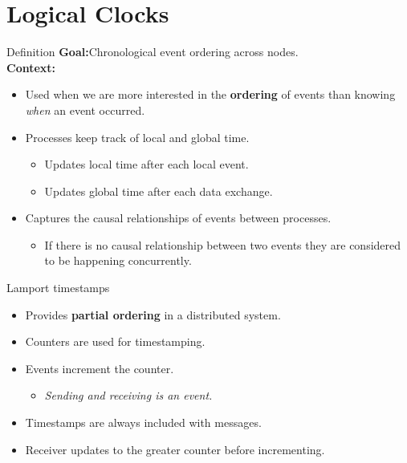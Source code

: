 \documentclass[10pt]{beamer}
\begin{document}
\section{Logical Clocks}

\begin{frame}{Definition}
  \textbf{Goal:}\qquad Chronological event ordering across nodes.\\
  \textbf{Context:}
  \begin{itemize}
    \vspace*{-0.2cm}
    \item Used when we are more interested in the \textbf{ordering} of events than knowing \textit{when} an event occurred.
    \item Processes keep track of local and global time.
    \begin{itemize}
      \item Updates local time after each local event.
      \item Updates global time after each data exchange.
    \end{itemize}
    \item Captures the causal relationships of events between processes.
    \begin{itemize}
      \item If there is no causal relationship between two events they are considered to be happening concurrently.
    \end{itemize}
  \end{itemize}
\end{frame}

\begin{frame}{Lamport timestamps}
  \begin{itemize}
    \item Provides \textbf{partial ordering} in a distributed system.
    \item Counters are used for timestamping.
    \item Events increment the counter.
    \begin{itemize}
      \item \textit{Sending and receiving is an event.}
    \end{itemize}
    \item Timestamps are always included with messages.
    \item Receiver updates to the greater counter before incrementing.
  \end{itemize}
\end{frame}
\end{document}
